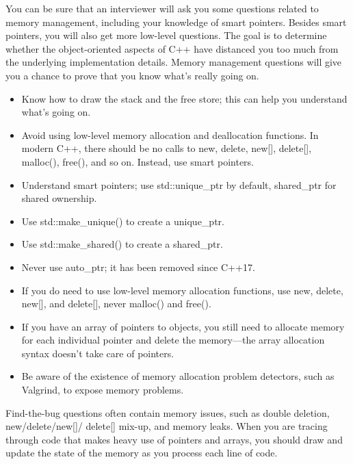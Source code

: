 
You can be sure that an interviewer will ask you some questions related to memory management, including your knowledge of smart pointers. Besides smart pointers, you will also get more low-level questions. The goal is to determine whether the object-oriented aspects of C++ have distanced you too much from the underlying implementation details. Memory management questions will give you a chance to prove that you know what’s really going on.


\begin{itemize}
\item
Know how to draw the stack and the free store; this can help you understand what’s going on.

\item
Avoid using low-level memory allocation and deallocation functions. In modern C++, there should be no calls to new, delete, new[], delete[], malloc(), free(), and so on. Instead, use smart pointers.

\item
Understand smart pointers; use std::unique\_ptr by default, shared\_ptr for shared ownership.

\item
Use std::make\_unique() to create a unique\_ptr.

\item
Use std::make\_shared() to create a shared\_ptr.

\item
Never use auto\_ptr; it has been removed since C++17.

\item
If you do need to use low-level memory allocation functions, use new, delete, new[], and delete[], never malloc() and free().

\item
If you have an array of pointers to objects, you still need to allocate memory for each individual pointer and delete the memory—the array allocation syntax doesn’t take care of pointers.

\item
Be aware of the existence of memory allocation problem detectors, such as Valgrind, to expose memory problems.
\end{itemize}


Find-the-bug questions often contain memory issues, such as double deletion, new/delete/new[]/ delete[] mix-up, and memory leaks. When you are tracing through code that makes heavy use of pointers and arrays, you should draw and update the state of the memory as you process each line of code.

